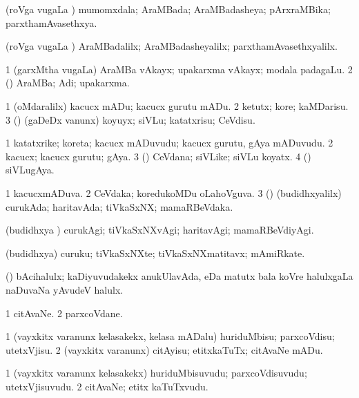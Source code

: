 \bentry
{}
\gl{\gu}
\bmng
(roVga \mo vugaLa \vi) mumomxdala; AraMBada; AraMBadasheya; pArxraMBika; parxthamAvasethxya. 
\emng
\eentry

\bentry
{}
\gl{\kirxvi}
\bmng
(roVga \mo vugaLa \vi) AraMBadalilx; AraMBadasheyalilx; parxthamAvasethxyalilx. 
\emng
\eentry

\bentry
{}
\gl{\nA}
\bmng
\bnum
\num{1} (garxMtha \mo vugaLa) AraMBa vAkayx; upakarxma vAkayx; modala padagaLu. 
\num{2} (\rUpa) AraMBa; Adi; upakarxma. 
\enum
\emng
\eentry

\bentry
{}
\gl{\sakirx}
\bmng
\bnum
\num{1} (oMdaralilx) kacucx mADu; kacucx gurutu mADu. 
\num{2} ketutx; kore; kaMDarisu. 
\num{3} (\shaveY) (gaDeDx \mo vanunx) koyuyx; siVLu; katatxrisu; CeVdisu. 
\enum
\emng
\eentry

\bentry
{}
\gl{\nA}
\bmng
\bnum
\num{1} katatxrike; koreta; kacucx mADuvudu; kacucx gurutu, gAya mADuvudu. 
\num{2} kacucx; kacucx gurutu; gAya. 
\num{3} (\shaveY) CeVdana; siVLike; siVLu koyatx. 
\num{4} (\shaveY) siVLugAya. 
\enum
\emng
\eentry

\bentry
{}
\gl{\gu}
\bmng
\bnum
\num{1} kacucxmADuva. 
\num{2} CeVdaka; koredukoMDu oLahoVguva. 
\num{3} (\rUpa) (budidhxyalilx) curukAda; haritavAda; tiVkaSxNX; mamaRBeVdaka. 
\enum
\emng
\eentry

\bentry
{}
\gl{\kirxvi}
\bmng
(budidhxya \vi) curukAgi; tiVkaSxNXvAgi; haritavAgi; mamaRBeVdiyAgi. 
\emng
\eentry

\bentry
{}
\gl{\nA}
\bmng
(budidhxya) curuku; tiVkaSxNXte; tiVkaSxNXmatitavx; mAmiRkate. 
\emng
\eentry

\bentry
{}
\gl{\nA}
\bmng
(\aMrashA) bAcihalulx; kaDiyuvudakekx anukUlavAda, eDa matutx bala koVre halulxgaLa naDuvaNa yAvudeV halulx. 
\emng
\eentry

\bentry
{}
\gl{\nA}
\bmng
\bnum
\num{1} citAvaNe. 
\num{2} parxcoVdane. 
\enum
\emng
\eentry

\bentry
{}
\gl{\sakirx}
\bmng
\bnum
\num{1} (vayxkitx \mo varanunx kelasakekx, kelasa mADalu) huriduMbisu; parxcoVdisu; utetxVjisu. 
\num{2} (vayxkitx \mo varanunx) citAyisu; etitxkaTuTx; citAvaNe mADu. 
\enum
\emng
\eentry

\bentry
{}
\gl{\nA}
\bmng
\bnum
\num{1} (vayxkitx \mo varanunx kelasakekx) huriduMbisuvudu; parxcoVdisuvudu; utetxVjisuvudu. 
\num{2} citAvaNe; etitx kaTuTxvudu. 
\enum
\emng
\eentry

